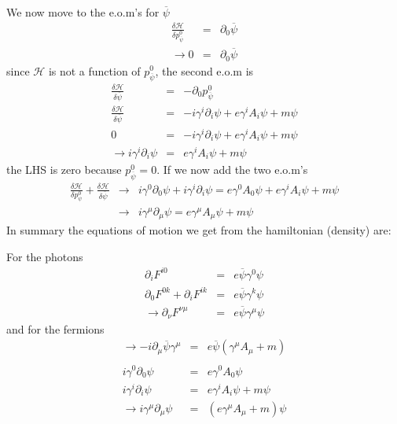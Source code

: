 \documentclass[aps,preprint,preprintnumbers,nofootinbib,showpacs,prd]{revtex4-1}
\newcommand{\nbea}{\begin{eqnarray*}}
\newcommand{\neea}{\end{eqnarray*}}
\begin{document}
We now move to the e.o.m's for $\overline \psi$
%
\nbea
\frac{\delta \mathcal{H}}{\delta p^0_{\overline \psi}} & = & \partial_0 \overline \psi \\
\rightarrow 0 & = & \partial_0 \overline \psi
\neea
%
since $\mathcal{H}$ is not a function of $p^0_{\overline \psi}$, the second e.o.m is
%
\nbea
\frac{\delta \mathcal{H}}{\delta \overline \psi} & = & -\partial_0 p^0_{\overline \psi} \\
\frac{\delta \mathcal{H}}{\delta \overline \psi} & = & - i \gamma^i \partial_i \psi + e \gamma^i A_i \psi + m \psi \\
0 & = & - i \gamma^i \partial_i \psi + e \gamma^i A_i \psi + m \psi \\
\rightarrow  i \gamma^i \partial_i \psi & = & e \gamma^i A_i \psi + m \psi 
\neea
%
the LHS is zero because $ p^0_{\overline \psi} = 0$. If we now add the two e.o.m's
%
\nbea
\frac{\delta \mathcal{H}}{\delta p^0_\psi} + \frac{\delta \mathcal{H}}{\delta \overline \psi} & \rightarrow & i \gamma^0 \partial_0 \psi + i \gamma^i \partial_i \psi = e \gamma^0 A_0 \psi + e \gamma^i A_i \psi + m \psi  \\
& \rightarrow & i \gamma^\mu \partial_\mu \psi = e \gamma^\mu A_\mu \psi + m \psi 
\neea
%
In summary the equations of motion we get from the hamiltonian (density) are:

For the photons
%
\nbea
\partial_i F^{i 0} & = & e \overline \psi \gamma^0 \psi \\
\partial_0 F^{0 k} + \partial_i F^{ik} & = & e \overline \psi \gamma^k \psi \\
\rightarrow \partial_\nu F^{\nu\mu} & = & e \overline \psi \gamma^\mu \psi 
\neea
%
and for the fermions
%
\nbea
\rightarrow -  i \partial_\mu \overline \psi \gamma^\mu & = & e \overline \psi (\gamma^\mu A_\mu + m ) \\ \\
i \gamma^0 \partial_0 \psi & = & e \gamma^0 A_0 \psi \\
i \gamma^i \partial_i \psi & = & e \gamma^i A_i \psi + m \psi \\
\rightarrow i \gamma^\mu \partial_\mu \psi & = & (e \gamma^\mu A_\mu + m) \psi
\neea
%
\end{document}
